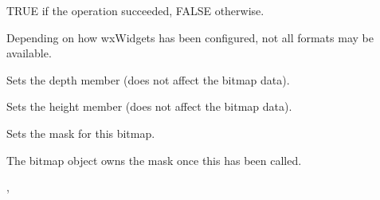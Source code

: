 

TRUE if the operation succeeded, FALSE otherwise.


Depending on how wxWidgets has been configured, not all formats may be available.



\label{wxbitmapsetdepth}


Sets the depth member (does not affect the bitmap data).



\label{wxbitmapsetheight}


Sets the height member (does not affect the bitmap data).



\label{wxbitmapsetmask}


Sets the mask for this bitmap.


The bitmap object owns the mask once this has been called.


, 


\label{wxbitmapsetpalette}


